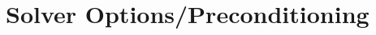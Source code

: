 \documentclass[
12pt, %
a4paper, %
onecolumn, %
portrait %
]{article}
\begin{document}
\section{Solver Options/Preconditioning}

\newpage

\renewcommand{\refname}{Reference} %




\end{document}
